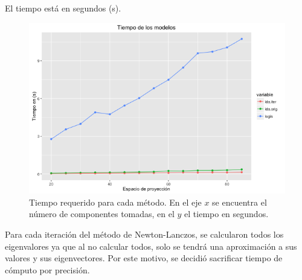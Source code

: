 El tiempo está en segundos (s).

\begin{figure}[!ht]
  \centering
  \includegraphics[width=.95\textwidth]{Figures/Chapter4_profilingOtto.png} 
  \caption[Tiempo de cómputo (Otto Group)]
  {Tiempo requerido para cada método. En el eje $x$ se encuentra el número de componentes tomadas, en el $y$ el tiempo en segundos.}
\end{figure}

Para cada iteración del método de Newton-Lanczos, se calcularon todos los eigenvalores ya que al no calcular todos, solo se tendrá una aproximación a sus valores y sus eigenvectores. Por este motivo, se decidió sacrificar tiempo de cómputo por precisión.



